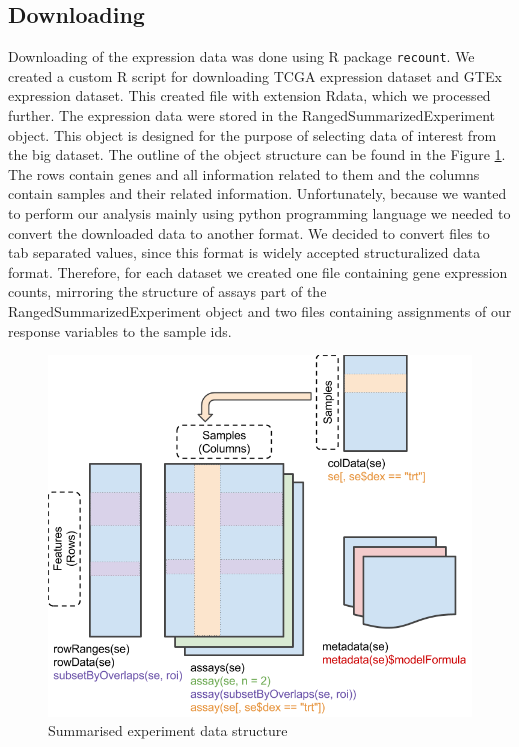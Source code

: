 \subsection{Downloading}
Downloading of the expression data was done using R package \verb'recount'. \cite{collado2017reproducible}
We created a custom R script for downloading TCGA expression dataset and GTEx expression dataset.
This created file with extension Rdata, which we processed further.
The expression data were stored in the RangedSummarizedExperiment object.
This object is designed for the purpose of selecting data of interest from the big dataset.
The outline of the object structure can be found in the Figure \ref{fig:sre}.
The rows contain genes and all information related to them and the columns contain samples and their related information.
Unfortunately, because we wanted to perform our analysis mainly using python programming language we needed to convert the downloaded data to another format.
We decided to convert files to tab separated values, since this format is widely accepted structuralized data format.
Therefore, for each dataset we created one file containing gene expression counts, mirroring the structure of assays part of the RangedSummarizedExperiment object and two files containing assignments of our response variables to the sample ids.

\begin{figure}
    \includegraphics[width=\linewidth]{images/SummarizedExperiment.png}
    \caption{Summarised experiment data structure}
    \label{fig:sre}
\end{figure}

